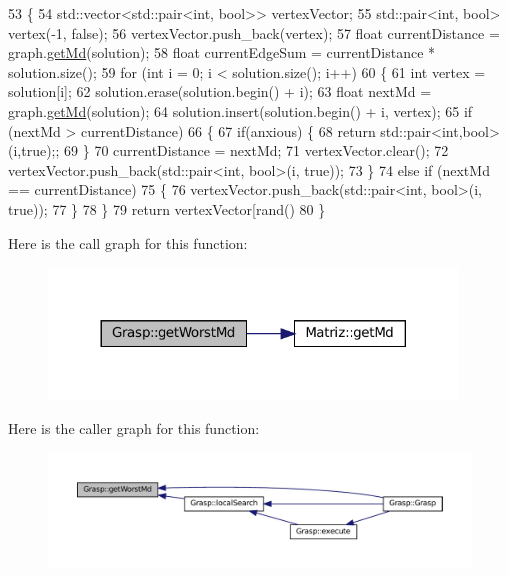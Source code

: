 \begin{DoxyCode}
53                                                            \{
54   std::vector<std::pair<int, bool>> vertexVector;
55   std::pair<int, bool> vertex(-1, \textcolor{keyword}{false});
56   vertexVector.push\_back(vertex);
57   \textcolor{keywordtype}{float} currentDistance = graph.\hyperlink{classMatriz_a8df14a27d791f24206dd633b2a685c5b}{getMd}(solution);
58   \textcolor{keywordtype}{float} currentEdgeSum = currentDistance * solution.size();
59   \textcolor{keywordflow}{for} (\textcolor{keywordtype}{int} i = 0; i < solution.size(); i++)
60   \{
61     \textcolor{keywordtype}{int} vertex = solution[i];
62     solution.erase(solution.begin() + i);
63     \textcolor{keywordtype}{float} nextMd = graph.\hyperlink{classMatriz_a8df14a27d791f24206dd633b2a685c5b}{getMd}(solution);
64     solution.insert(solution.begin() + i, vertex);
65     \textcolor{keywordflow}{if} (nextMd > currentDistance)
66     \{
67       \textcolor{keywordflow}{if}(anxious) \{
68         \textcolor{keywordflow}{return} std::pair<int,bool>(i,\textcolor{keyword}{true});;
69       \}
70       currentDistance = nextMd;
71       vertexVector.clear();
72       vertexVector.push\_back(std::pair<int, bool>(i, \textcolor{keyword}{true}));
73     \}
74     \textcolor{keywordflow}{else} \textcolor{keywordflow}{if} (nextMd == currentDistance)
75     \{
76       vertexVector.push\_back(std::pair<int, bool>(i, \textcolor{keyword}{true}));
77     \}
78   \}
79   \textcolor{keywordflow}{return} vertexVector[rand() %
80 \}
\end{DoxyCode}
Here is the call graph for this function\+:
\nopagebreak
\begin{figure}[H]
\begin{center}
\leavevmode
\includegraphics[width=308pt]{classGrasp_a858a5aee4066bf5ef7946e8ea3e10bcf_cgraph}
\end{center}
\end{figure}
Here is the caller graph for this function\+:
\nopagebreak
\begin{figure}[H]
\begin{center}
\leavevmode
\includegraphics[width=350pt]{classGrasp_a858a5aee4066bf5ef7946e8ea3e10bcf_icgraph}
\end{center}
\end{figure}
\mbox{\label{classGrasp_a7c5bebb4a0dea342928f66fb73a56559}} 
